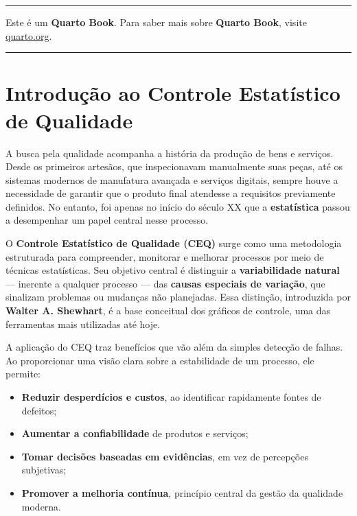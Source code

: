 \documentclass[
  portuguese,
  11pt,
  a4paper,
  DIV=11,
  numbers=noendperiod]{scrreprt}
\providecommand{\tightlist}{%
  \setlength{\itemsep}{0pt}\setlength{\parskip}{0pt}}
\begin{document}
\begin{center}\rule{0.5\linewidth}{0.5pt}\end{center}

Este é um \textbf{Quarto Book}. Para saber mais sobre \textbf{Quarto
Book}, visite \href{https://quarto.org/docs/books/}{quarto.org}.

\begin{center}\rule{0.5\linewidth}{0.5pt}\end{center}


\chapter{Introdução ao Controle Estatístico de
Qualidade}\label{introduuxe7uxe3o-ao-controle-estatuxedstico-de-qualidade}

A busca pela qualidade acompanha a história da produção de bens e
serviços. Desde os primeiros artesãos, que inspecionavam manualmente
suas peças, até os sistemas modernos de manufatura avançada e serviços
digitais, sempre houve a necessidade de garantir que o produto final
atendesse a requisitos previamente definidos. No entanto, foi apenas no
início do século XX que a \textbf{estatística} passou a desempenhar um
papel central nesse processo.

O \textbf{Controle Estatístico de Qualidade (CEQ)} surge como uma
metodologia estruturada para compreender, monitorar e melhorar processos
por meio de técnicas estatísticas. Seu objetivo central é distinguir a
\textbf{variabilidade natural} --- inerente a qualquer processo --- das
\textbf{causas especiais de variação}, que sinalizam problemas ou
mudanças não planejadas. Essa distinção, introduzida por \textbf{Walter
A. Shewhart}, é a base conceitual dos gráficos de controle, uma das
ferramentas mais utilizadas até hoje.

A aplicação do CEQ traz benefícios que vão além da simples detecção de
falhas. Ao proporcionar uma visão clara sobre a estabilidade de um
processo, ele permite:

\begin{itemize}
\tightlist
\item
  \textbf{Reduzir desperdícios e custos}, ao identificar rapidamente
  fontes de defeitos;
\item
  \textbf{Aumentar a confiabilidade} de produtos e serviços;
\item
  \textbf{Tomar decisões baseadas em evidências}, em vez de percepções
  subjetivas;
\item
  \textbf{Promover a melhoria contínua}, princípio central da gestão da
  qualidade moderna.
\end{itemize}
\end{document}
